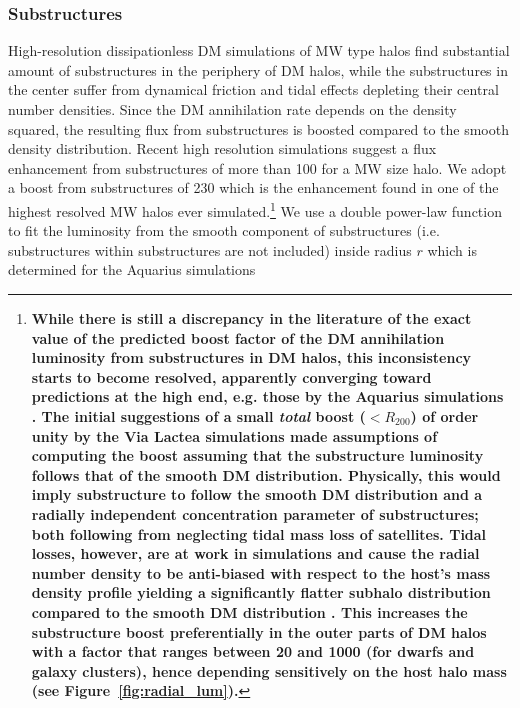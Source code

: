 \documentclass[10pt,aps,pra,reprint,amsmath,amsfonts,amssymb,showpacs,nofootinbib,floatfix]{revtex4-1}
\def\C#1{{\bf #1}}
\begin{document}
\subsubsection{Substructures}
\label{sect:subst}
High-resolution dissipationless DM simulations of MW type halos find substantial
amount of substructures in the periphery of DM halos, while the substructures in
the center suffer from dynamical friction and tidal effects depleting their
central number densities. Since the DM annihilation rate depends on the density
squared, the resulting flux from substructures is boosted compared to the smooth
density distribution. Recent high resolution simulations suggest a flux
enhancement from substructures of more than 100 \cite{2008MNRAS.391.1685S,
  2010ApJ...718..899A} for a MW size halo. We adopt a boost from substructures
of 230 which is the enhancement found in one of the highest resolved MW halos
ever simulated.\footnote{\C{While there is still a discrepancy in the literature
    of the exact value of the predicted boost factor of the DM annihilation
    luminosity from substructures in DM halos, this inconsistency starts to
    become resolved, apparently converging toward predictions at the high end,
    e.g. those by the Aquarius simulations \protect \cite{2008MNRAS.391.1685S,
      2008Natur.456...73S}. The initial suggestions of a small {\em total} boost
    ($<R_{200}$) of order unity by the Via Lactea simulations
    \cite{2008JPhCS.125a2008K} made assumptions of computing the boost assuming
    that the substructure luminosity follows that of the smooth DM
    distribution. Physically, this would imply substructure to follow the smooth
    DM distribution and a radially independent concentration parameter of
    substructures; both following from neglecting tidal mass loss of
    satellites. Tidal losses, however, are at work in simulations and cause the
    radial number density to be anti-biased with respect to the host's mass
    density profile yielding a significantly flatter subhalo distribution
    compared to the smooth DM distribution \cite{2010ApJ...718..899A}. This
    increases the substructure boost preferentially in the outer parts of DM
    halos with a factor that ranges between 20 and 1000 (for dwarfs and galaxy
    clusters), hence depending sensitively on the host halo mass (see
    Figure~\ref{fig:radial_lum}).}}  We use a double power-law function to fit
the luminosity from the smooth component of substructures (i.e. substructures
within substructures are not included) inside radius $r$ which is determined for
the Aquarius simulations
\end{document}
